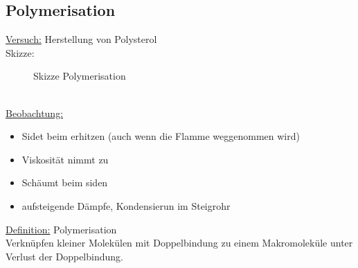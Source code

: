 \documentclass[../main.tex]{subfiles}
\begin{document}
\subsection{Polymerisation}
\underline{Versuch:} Herstellung von Polysterol\\
Skizze:
\begin{figure}[h]
    \centering
    \caption{Skizze Polymerisation}
    \label{fig:skizze-polymerisation}
\end{figure}
\\
\underline{Beobachtung:}
\begin{itemize}
    \item Sidet beim erhitzen (auch wenn die Flamme weggenommen wird)
    \item Viskosität nimmt zu
    \item Schäumt beim siden
    \item aufsteigende Dämpfe, Kondensierun im Steigrohr
\end{itemize}
\underline{Definition:} Polymerisation \\
Verknüpfen kleiner Molekülen mit Doppelbindung zu einem Makromoleküle unter
Verlust der Doppelbindung.\\
%
\end{document}
